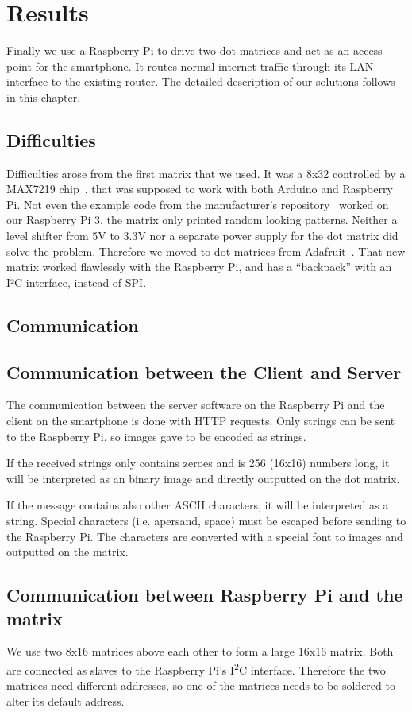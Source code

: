 \documentclass[conference]{IEEEtran}
\begin{document}
\section{Results}
Finally we use a Raspberry Pi to drive two dot matrices and act as an access point for the smartphone. It routes normal internet traffic through its LAN interface to the existing router. The detailed description of our solutions follows in this chapter.

\subsection{Difficulties}
Difficulties arose from the first matrix that we used. It was a 8x32 controlled by a MAX7219 chip~\cite{azdelivery464}, that was supposed to work with both Arduino and Raspberry Pi. Not even the example code from the manufacturer's repository~\cite{azdelivery464} worked on our Raspberry Pi 3, the matrix only printed random looking patterns. Neither a level shifter from 5V to 3.3V nor a separate power supply for the dot matrix did solve the problem. Therefore we moved to dot matrices from Adafruit~\cite{adafruit88}. That new matrix worked flawlessly with the Raspberry Pi, and has a ``backpack'' with an I²C interface, instead of SPI.

\subsection{Communication}


\subsection{Communication between the Client and Server}
The communication between the server software on the Raspberry Pi and the client on the smartphone is done with HTTP requests. Only strings can be sent to the Raspberry Pi, so images gave to be encoded as strings.

If the received strings only contains zeroes and is 256 (16x16) numbers long, it will be interpreted as an binary image and directly outputted on the dot matrix.

If the message contains also other ASCII characters, it will be interpreted as a string. Special characters (i.e. apersand, space) must be escaped before sending to the Raspberry Pi. The characters are converted with a special font to images and outputted on the matrix.

\subsection{Communication between Raspberry Pi and the matrix}
We use two 8x16 matrices above each other to form a large 16x16 matrix. Both are connected as slaves to the Raspberry Pi's I\textsuperscript{2}C interface. Therefore the two matrices need different addresses, so one of the matrices needs to be soldered to alter its default address.
\end{document}
